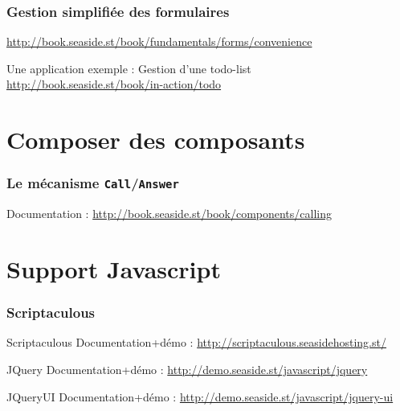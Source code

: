 \documentclass[9pt,compress]{beamer}
\begin{document}
\begin{frame}\frametitle{Gestion simplifiée des formulaires}
\vfill
\centering\url{http://book.seaside.st/book/fundamentals/forms/convenience}
\vfill
\begin{center}
	Une application exemple : Gestion d'une todo-list\\
	\url{http://book.seaside.st/book/in-action/todo}
\end{center}
\vfill
\end{frame}




	

\section{Composer des composants} %

\begin{frame}[containsverbatim]\frametitle{Le mécanisme \texttt{Call}/\texttt{Answer}}
\vfill
\centering Documentation : \url{http://book.seaside.st/book/components/calling}
\vfill
\end{frame}



\section{Support Javascript} %

\begin{frame}[containsverbatim]\frametitle{Scriptaculous}


\begin{block}{Scriptaculous}
\centering Documentation+démo : \url{http://scriptaculous.seasidehosting.st/}
\end{block}

\begin{block}{JQuery}
\centering Documentation+démo : \url{http://demo.seaside.st/javascript/jquery}
\end{block}

\begin{block}{JQueryUI}
\centering Documentation+démo : \url{http://demo.seaside.st/javascript/jquery-ui}
\end{block}

\end{frame}
\end{document}
